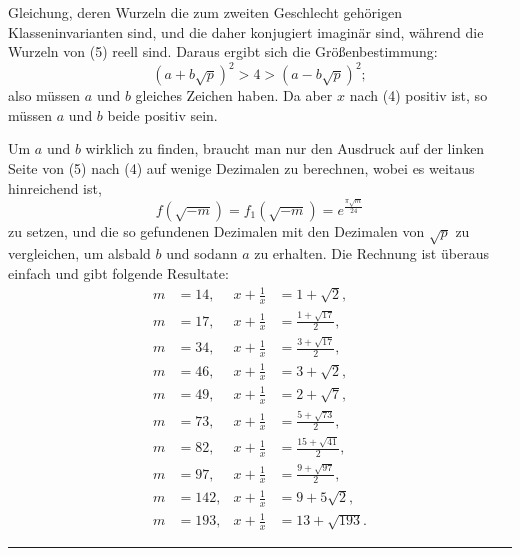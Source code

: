 Gleichung, deren Wurzeln die zum zweiten Geschlecht gehörigen Klasseninvarianten sind, und die daher konjugiert imaginär sind, während die Wurzeln von (5) reell sind. Daraus ergibt sich die Größenbestimmung:
\[
(a+b\sqrt p)^2 > 4 > (a-b\sqrt p)^2;
\]
also müssen $a$ und $b$ gleiches Zeichen haben. Da aber $x$ nach (4) positiv ist, so müssen $a$ und $b$ beide positiv sein.

Um $a$ und $b$ wirklich zu finden, braucht man nur den Ausdruck auf der linken Seite von (5) nach (4) auf wenige Dezimalen zu berechnen, wobei es weitaus hinreichend ist,
\[
f(\sqrt{-m}) = f_1(\sqrt{-m}) = e^{\frac{\pi\sqrt m}{24}}
\]
zu setzen, und die so gefundenen Dezimalen mit den Dezimalen von $\sqrt p$ zu vergleichen, um alsbald $b$ und sodann $a$ zu erhalten. Die Rechnung ist überaus einfach und gibt folgende Resultate:
\[
\begin{aligned}
m &= 14, & x + \frac1x &= 1 + \sqrt2,\\
m &= 17, & x + \frac1x &= \frac{1+\sqrt{17}}{2},\\
m &= 34, & x + \frac1x &= \frac{3+\sqrt{17}}{2},\\
m &= 46, & x + \frac1x &= 3 + \sqrt2,\\
m &= 49, & x + \frac1x &= 2 + \sqrt7,\\
m &= 73, & x + \frac1x &= \frac{5+\sqrt{73}}{2},\\
m &= 82, & x + \frac1x &= \frac{15+\sqrt{41}}{2},\\
m &= 97, & x + \frac1x &= \frac{9+\sqrt{97}}{2},\\
m &= 142, & x + \frac1x &= 9 + 5\sqrt2,\\
m &= 193, & x + \frac1x &= 13 + \sqrt{193}.
\end{aligned}
\]

\begin{center}\rule{3cm}{0.4pt}\end{center}
